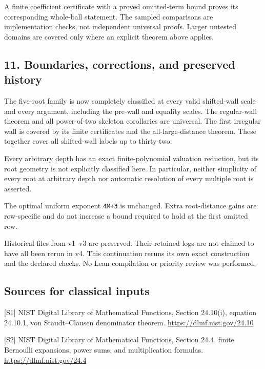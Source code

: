 \documentclass[11pt,letterpaper]{article}
\begin{document}
A finite coefficient certificate with a proved omitted-term bound proves its corresponding whole-ball statement. The sampled comparisons are implementation checks, not independent universal proofs. Larger untested domains are covered only where an explicit theorem above applies.

\subsection{11. Boundaries, corrections, and preserved history}\label{boundaries-corrections-and-preserved-history}

The five-root family is now completely classified at every valid shifted-wall scale and every argument, including the pre-wall and equality scales. The regular-wall theorem and all power-of-two skeleton corollaries are universal. The first irregular wall is covered by its finite certificates and the all-large-distance theorem. These together cover all shifted-wall labels up to thirty-two.

Every arbitrary depth has an exact finite-polynomial valuation reduction, but its root geometry is not explicitly classified here. In particular, neither simplicity of every root at arbitrary depth nor automatic resolution of every multiple root is asserted.

The optimal uniform exponent \texttt{4M+3} is unchanged. Extra root-distance gains are row-specific and do not increase a bound required to hold at the first omitted row.

Historical files from v1--v3 are preserved. Their retained logs are not claimed to have all been rerun in v4. This continuation reruns its own exact construction and the declared checks. No Lean compilation or priority review was performed.

\subsection{Sources for classical inputs}\label{sources-for-classical-inputs}

{[}S1{]} NIST Digital Library of Mathematical Functions, Section 24.10(i), equation 24.10.1, von Staudt--Clausen denominator theorem. \url{https://dlmf.nist.gov/24.10}

{[}S2{]} NIST Digital Library of Mathematical Functions, Section 24.4, finite Bernoulli expansions, power sums, and multiplication formulas. \url{https://dlmf.nist.gov/24.4}
\end{document}
